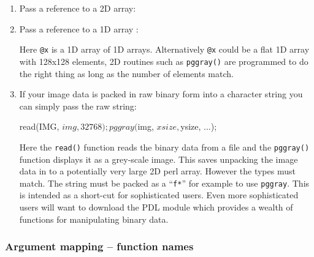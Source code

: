 \documentclass[twoside,11pt]{starlink}
\begin{document}
\begin{enumerate}
\item Pass a reference to a 2D array:
\begin{small}
\end{small}


\item Pass a reference to a 1D array :
\begin{small}
\end{small}

Here \texttt{@x} is a 1D array of 1D arrays.  Alternatively \texttt{@x}
could be a flat 1D array with 128x128 elements, 2D routines such as
\texttt{pggray()} are programmed to do the right thing as long as the
number of elements match.

\item If your image data is packed in raw binary form into a character
string you can simply pass the raw string:

\begin{small}
\begin{terminalv}
read(IMG, $img, 32768);
pggray($img, $xsize, $ysize, ...);
\end{terminalv}
\end{small}

   Here the \texttt{read()} function reads the binary data from a file
   and the \texttt{pggray()} function displays it as a grey-scale image.
   This saves unpacking the image data in to a potentially very large
   2D perl array. However the types must match. The string must be
   packed as a ``\texttt{f*}'' for example to use \texttt{pggray}. This is
   intended as a short-cut for sophisticated users. Even more
   sophisticated users will want to download the PDL module which
   provides a wealth of functions for manipulating binary data.

\end{enumerate}

\subsubsection{Argument mapping -- function names}
\end{document}

